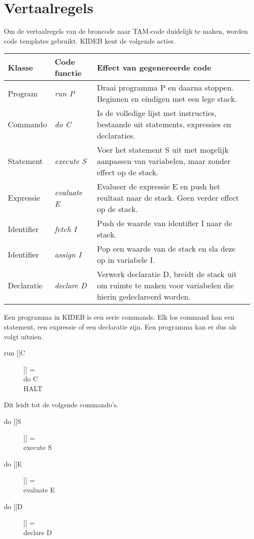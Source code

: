 \chapter{Vertaalregels} %
\label{cha:vertaalregels}
Om de vertaalregels van de broncode naar TAM-code duidelijk te maken, worden code templates gebruikt. KIDEB kent de volgende acties.

\begin{tabular}{| l | l | p{6 cm} |}
    \hline
    Klasse & Code functie & Effect van gegenereerde code \\
    \hline
    Program & \emph{run P} & Draai programma P en daarna stoppen. Beginnen en eindigen met een lege stack. \\
    \hline
    Commando & \emph{do C} & Is de volledige lijst met instructies, bestaande uit statements, expressies en declaraties. \\
    \hline
    Statement & \emph{execute S} & Voer het statement S uit met mogelijk aanpassen van variabelen, maar zonder effect op de stack. \\
    \hline
    Expressie & \emph{evaluate E} & Evalueer de expressie E en push het reultaat naar de stack. Geen verder effect op de stack. \\
    \hline
    Identifier & \emph{fetch I} & Push de waarde van identifier I naar de stack. \\
    \hline
    Identifier & \emph{assign I} & Pop een waarde van de stack en sla deze op in variabele I. \\
    \hline
    Declaratie & \emph{declare D} & Verwerk declaratie D, breidt de stack uit om ruimte te maken voor variabelen die hierin gedeclareerd worden. \\
    \hline
\end{tabular} 

Een programma in KIDEB is een serie commands. Elk los command kan een statement, een expressie of een declaratie zijn. Een programma kan er dus als volgt uitzien.
\begin{description}
    \item[run [[C]]] = \hfill \\
        do C \\
        HALT
\end{description}

Dit leidt tot de volgende commando's.
\begin{description}
    \item[do [[S]]] = \hfill \\
        execute S
    \item[do [[E]]] = \hfill \\
        evaluate E
    \item[do [[D]]] = \hfill \\
        declare D 
\end{description}

